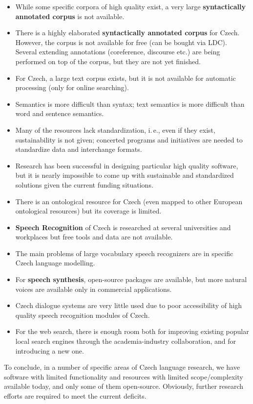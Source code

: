 \begin{multicols}{2}
\begin{itemize}
\item While some specific corpora of high quality exist, a very large \textbf{syntactically annotated corpus} is not available.
\item There is a highly elaborated \textbf{syntactically annotated corpus} for Czech. However, the corpus is not available for free (can be bought via LDC). Several extending annotations (coreference, discourse etc.) are being performed on top of the corpus, but they are not yet finished.
\item For Czech, a large text corpus exists, but it is not available for automatic processing (only for online searching).
\item Semantics is more difficult than syntax; text semantics is more difficult than word and sentence semantics.
\item Many of the resources lack standardization, i.\,e., even if they exist, sustainability is not given; concerted programs and initiatives are needed to standardize data and interchange formats.
\item Research has been successful in designing particular high quality software, but it is nearly impossible to come up with sustainable and standardized solutions given the current funding situations.
\item There is an ontological resource for Czech (even mapped to other European ontological resources) but its coverage is limited.
\item \textbf{Speech Recognition} of Czech is researched at several universities and workplaces but free tools and data are not available.
\item The main problems of large vocabulary speech recognizers are in specific Czech language modelling.
\item For \textbf{speech synthesis}, open-source packages are available, but more natural voices are available only in commercial applications.
\item Czech dialogue systems are very little used due to poor accessibility of high quality speech recognition modules of Czech.
\item For the web search, there is enough room both for improving existing popular local search engines through the academia-industry collaboration, and for introducing a new one.
\end{itemize}
To conclude, in a number of specific areas of Czech language research, we have software with limited functionality and resources with limited scope/complexity available today, and only some of them open-source. Obviously, further research efforts are required to meet the current deficits.


\end{multicols}
